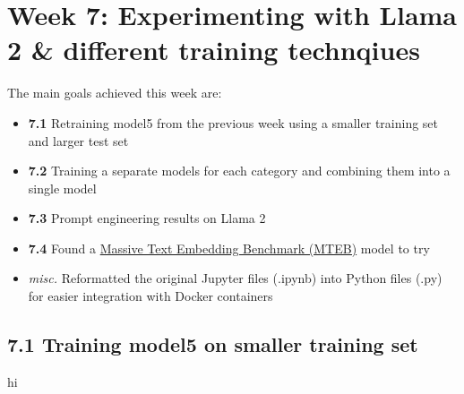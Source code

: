\section*{Week 7: Experimenting with Llama 2 \& different training technqiues}

The main goals achieved this week are:
\begin{itemize}[topsep=0pt]
    \item \textbf{7.1} Retraining model5 from the previous week using a smaller training set and larger test set
    \item \textbf{7.2} Training a separate models for each category and combining them into a single model
    \item \textbf{7.3} Prompt engineering results on Llama 2
    \item \textbf{7.4} Found a \href{https://arxiv.org/pdf/2210.07316.pdf}{Massive Text Embedding Benchmark (MTEB)} model to try
    \item \textit{misc.} Reformatted the original Jupyter files (.ipynb) into Python files (.py) for easier integration with Docker containers
\end{itemize}

\subsection*{7.1 Training model5 on smaller training set}
hi